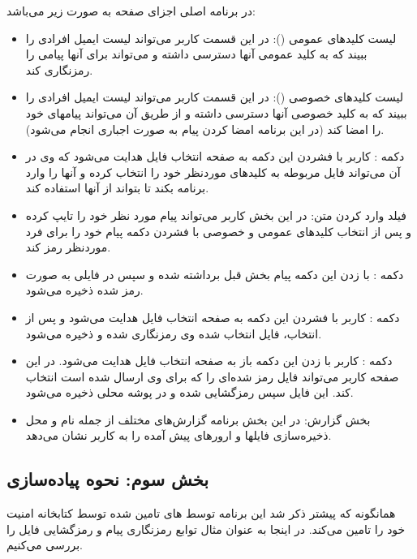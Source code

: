 \documentclass{report}
\begin{document}
در برنامه اصلی اجزای صفحه به صورت زیر می‌باشد:
\begin{itemize}
    \item 
    لیست کلیدهای عمومی ():
    در این قسمت کاربر می‌تواند لیست ایمیل افرادی را ببیند که به کلید عمومی آنها دسترسی داشته و می‌تواند برای آنها پیامی را رمزنگاری کند.
    
    \item
    لیست کلید‌های خصوصی ():
    در این قسمت کاربر می‌تواند لیست ایمیل افرادی را ببیند که به کلید خصوصی آنها دسترسی داشته و از طریق آن می‌تواند پیامهای خود را امضا کند (در این برنامه امضا کردن پیام به صورت اجباری انجام می‌شود).
    \item 
    دکمه :
    کاربر با فشردن این دکمه به صفحه انتخاب فایل هدایت می‌شود که وی در آن می‌تواند فایل مربوطه به کلیدهای موردنظر خود را انتخاب کرده و آنها را وارد برنامه بکند تا بتواند از آنها استفاده کند.
    
    \item 
    فیلد وارد کردن متن:
    در این بخش کاربر می‌تواند پیام مورد نظر خود را تایپ کرده و پس از انتخاب کلیدهای عمومی و خصوصی با فشردن دکمه  پیام خود را برای فرد موردنظر رمز کند.
    
    \item 
    دکمه :
    با زدن این دکمه پیام بخش قبل برداشته شده و سپس در فایلی به صورت رمز شده ذخیره می‌شود.
    
    \item 
    دکمه :
    کاربر با فشردن این دکمه به صفحه انتخاب فایل هدایت می‌شود و پس از انتخاب، فایل انتخاب شده وی رمزنگاری شده و ذخیره می‌شود.
    
    \item
    دکمه :
    کاربر با زدن این دکمه باز به صفحه انتخاب فایل هدایت می‌شود. در این صفحه کاربر می‌تواند فایل رمز شده‌ای را که برای وی ارسال شده است انتخاب کند. این فایل سپس رمزگشایی شده و در پوشه محلی ذخیره می‌شود.

    \item
    بخش گزارش:
    در این بخش برنامه گزارش‌های مختلف از جمله نام و محل ذخیره‌سازی فایلها و ارورهای پیش آمده را به کاربر نشان می‌دهد.
\end{itemize}

\subsection*{بخش سوم: نحوه پیاده‌سازی}

همانگونه که پیشتر ذکر شد این برنامه توسط  های تامین شده توسط کتابخانه  امنیت خود را تامین می‌کند. در اینجا به عنوان مثال توابع رمزنگاری پیام و رمزگشایی فایل را بررسی می‌کنیم.
\end{document}
